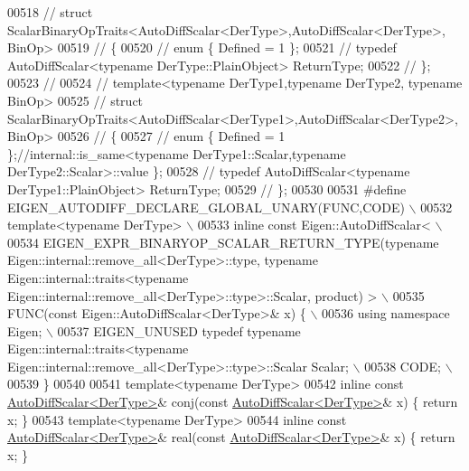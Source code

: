 \begin{DoxyCode}
00518 \textcolor{comment}{// struct ScalarBinaryOpTraits<AutoDiffScalar<DerType>,AutoDiffScalar<DerType>, BinOp>}
00519 \textcolor{comment}{// \{}
00520 \textcolor{comment}{//   enum \{ Defined = 1 \};}
00521 \textcolor{comment}{//   typedef AutoDiffScalar<typename DerType::PlainObject> ReturnType;}
00522 \textcolor{comment}{// \};}
00523 \textcolor{comment}{//}
00524 \textcolor{comment}{// template<typename DerType1,typename DerType2, typename BinOp>}
00525 \textcolor{comment}{// struct ScalarBinaryOpTraits<AutoDiffScalar<DerType1>,AutoDiffScalar<DerType2>, BinOp>}
00526 \textcolor{comment}{// \{}
00527 \textcolor{comment}{//   enum \{ Defined = 1 \};//internal::is\_same<typename DerType1::Scalar,typename DerType2::Scalar>::value
       \};}
00528 \textcolor{comment}{//   typedef AutoDiffScalar<typename DerType1::PlainObject> ReturnType;}
00529 \textcolor{comment}{// \};}
00530 
00531 \textcolor{preprocessor}{#define EIGEN\_AUTODIFF\_DECLARE\_GLOBAL\_UNARY(FUNC,CODE) \(\backslash\)}
00532 \textcolor{preprocessor}{  template<typename DerType> \(\backslash\)}
00533 \textcolor{preprocessor}{  inline const Eigen::AutoDiffScalar< \(\backslash\)}
00534 \textcolor{preprocessor}{  EIGEN\_EXPR\_BINARYOP\_SCALAR\_RETURN\_TYPE(typename Eigen::internal::remove\_all<DerType>::type, typename
       Eigen::internal::traits<typename Eigen::internal::remove\_all<DerType>::type>::Scalar, product) > \(\backslash\)}
00535 \textcolor{preprocessor}{  FUNC(const Eigen::AutoDiffScalar<DerType>& x) \{ \(\backslash\)}
00536 \textcolor{preprocessor}{    using namespace Eigen; \(\backslash\)}
00537 \textcolor{preprocessor}{    EIGEN\_UNUSED typedef typename Eigen::internal::traits<typename
       Eigen::internal::remove\_all<DerType>::type>::Scalar Scalar; \(\backslash\)}
00538 \textcolor{preprocessor}{    CODE; \(\backslash\)}
00539 \textcolor{preprocessor}{  \}}
00540 
00541 \textcolor{keyword}{template}<\textcolor{keyword}{typename} DerType>
00542 \textcolor{keyword}{inline} \textcolor{keyword}{const} \hyperlink{class_eigen_1_1_auto_diff_scalar}{AutoDiffScalar<DerType>}& conj(\textcolor{keyword}{const} 
      \hyperlink{class_eigen_1_1_auto_diff_scalar}{AutoDiffScalar<DerType>}& x)  \{ \textcolor{keywordflow}{return} x; \}
00543 \textcolor{keyword}{template}<\textcolor{keyword}{typename} DerType>
00544 \textcolor{keyword}{inline} \textcolor{keyword}{const} \hyperlink{class_eigen_1_1_auto_diff_scalar}{AutoDiffScalar<DerType>}& real(\textcolor{keyword}{const} 
      \hyperlink{class_eigen_1_1_auto_diff_scalar}{AutoDiffScalar<DerType>}& x)  \{ \textcolor{keywordflow}{return} x; \}

\end{DoxyCode}
